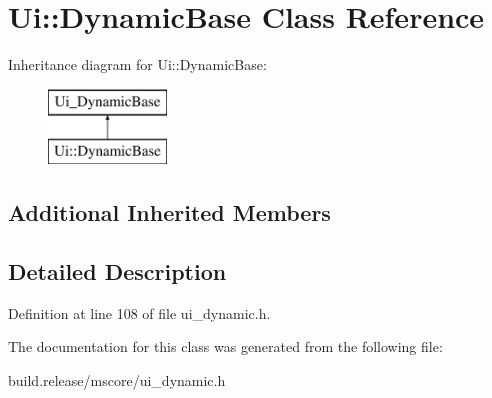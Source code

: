 \hypertarget{class_ui_1_1_dynamic_base}{}\section{Ui\+:\+:Dynamic\+Base Class Reference}
\label{class_ui_1_1_dynamic_base}
Inheritance diagram for Ui\+:\+:Dynamic\+Base\+:\begin{figure}[H]
\begin{center}
\leavevmode
\includegraphics[height=2.000000cm]{class_ui_1_1_dynamic_base}
\end{center}
\end{figure}
\subsection*{Additional Inherited Members}


\subsection{Detailed Description}


Definition at line 108 of file ui\+\_\+dynamic.\+h.



The documentation for this class was generated from the following file\+:\begin{DoxyCompactItemize}
\item 
build.\+release/mscore/ui\+\_\+dynamic.\+h\end{DoxyCompactItemize}
